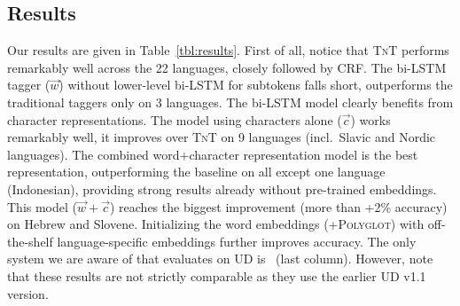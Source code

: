 \documentclass[11pt]{article}
\begin{document}
\begin{table}
\caption{Grouping of languages.}
\label{tbl:lang}
\end{table}





\subsection{Results}


Our results are given in Table~\ref{tbl:results}. First of all, notice that \textsc{TnT} performs remarkably well across the 22 languages, closely followed by CRF. The bi-LSTM
tagger ($\vec{w}$) without lower-level bi-LSTM for subtokens falls short, outperforms the traditional taggers only on 3 languages. The bi-LSTM model clearly benefits from character 
representations. The model using characters alone ($\vec{c}$) works remarkably well, it improves over \textsc{TnT} on 9 languages (incl.\ Slavic and Nordic languages). The combined word+character representation
model is the best representation, outperforming the baseline on all except one language (Indonesian), providing strong results already without pre-trained embeddings. This model (${\vec{w}+\vec{c}}$) reaches the biggest improvement (more than +2\% accuracy) on Hebrew and Slovene. 
 Initializing the word embeddings (+\textsc{Polyglot}) with off-the-shelf language-specific embeddings further improves accuracy.  
 The only system we are aware of that evaluates on UD is~ (last column). However, note that these results are not strictly comparable as they use the earlier UD v1.1 version.
\end{document}
